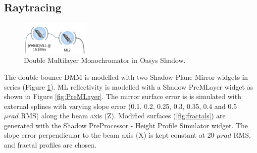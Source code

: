 \subsection{Raytracing}
\begin{figure}
\centering
\includegraphics[width=0.3\textwidth]{images/DMM_oasys.png}
\caption{\label{fig:DMM_oasys} Double Multilayer Monochromator in Oasys Shadow.}
\end{figure}

The double-bounce DMM is modelled with two Shadow Plane Mirror widgets in series (Figure \ref{fig:DMM_oasys}). ML reflectivity is modelled with a Shadow PreMLayer widget as shown in Figure \ref{fig:PreMLayer}. The mirror surface error is is simulated with external splines with varying slope error (0.1, 0.2, 0.25, 0.3, 0.35, 0.4 and 0.5 $\mu rad$ RMS) along the beam axis (Z). Modified surfaces (\ref{fig:fractals}) are generated with the Shadow PreProcessor - Height Profile Simulator widget. The slope error perpendicular to the beam axis (X) is kept constant at 20 $\mu rad$ RMS, and fractal profiles are chosen. 

